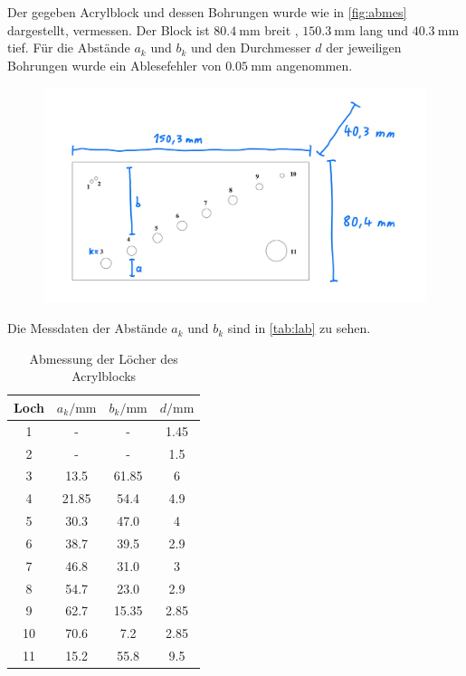 Der gegeben Acrylblock und dessen Bohrungen wurde wie in \autoref{fig:abmes} dargestellt, vermessen.
Der Block ist $\SI{80.4}{\milli\meter}$ breit , $\SI{150.3}{\milli\meter}$ lang und $\SI{40.3}{\milli\meter}$ tief.
Für die Abstände $a_k$ und $b_k$ und den Durchmesser $d$ der jeweiligen Bohrungen wurde ein Ablesefehler von $\SI{0.05}{\milli\meter}$
angenommen.
\begin{figure}[H]
    \centering
    \includegraphics[width=0.9\linewidth]{content/grafik/abmessung.jpg}
	\captionsetup{width=0.765\linewidth}
    \label{fig:abmes}
\end{figure}
Die Messdaten der Abstände $a_k$ und $b_k$ sind in \autoref{tab:lab} zu sehen. 
\begin{table}[H]
    \centering
    \caption{Abmessung der Löcher des Acrylblocks}
    \label{tab:lab}
\begin{tabular}{c c c c}
    \toprule
    Loch & $a_k / \si{\milli\meter}$ & $b_k / \si{\milli\meter}$ & $d / \si{\milli\meter}$\\
    \midrule
    1 &   -  &    -   & 1.45 \\
    2 &   -  &    -   & 1.5 \\
    3 & 13.5 & 61.85 &    6  \\
    4 &21.85 &  54.4 &  4.9  \\
    5 &30.3 &  47.0 &    4  \\
    6 & 38.7 &  39.5 &  2.9  \\
    7 &46.8 &  31.0 &    3  \\
    8 &54.7 &  23.0 &  2.9  \\
    9 & 62.7 & 15.35 & 2.85  \\
    10 & 70.6 &   7.2 & 2.85  \\
    11 &15.2 &  55.8 &  9.5 \\
    \bottomrule
    \end{tabular}
\end{table}

